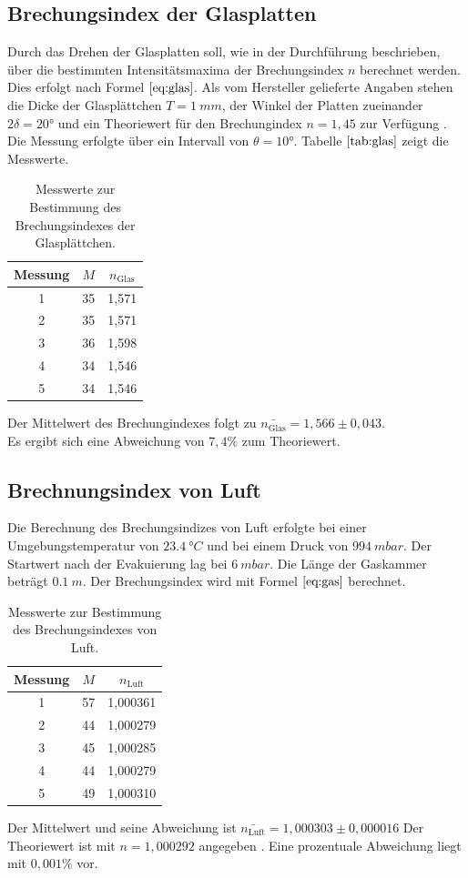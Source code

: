 \subsection{Brechungsindex der Glasplatten}
Durch das Drehen der Glasplatten soll, wie in der Durchführung beschrieben, über die bestimmten Intensitätsmaxima
der Brechungsindex $n$ berechnet werden.
Dies erfolgt nach Formel $\ref{eq:glas}$.
Als vom Hersteller gelieferte Angaben \cite{Anleitung} stehen die Dicke der Glasplättchen $T=\SI{1}{mm}$, der Winkel der Platten zueinander $2\delta=20°$ und ein Theoriewert für
den Brechungindex $n= 1,45$ zur Verfügung \cite{brechglas}.
Die Messung erfolgte über ein Intervall von $\theta = 10°$.
Tabelle $\ref{tab:glas}$ zeigt die Messwerte.

\begin{table}[H]
\centering
\begin{tabular}{c c c}
{Messung} & {$M$} & {$n_\text{Glas}$} \\
\midrule
1 & 35 & 1,571 \\
2 & 35 & 1,571 \\
3 & 36 & 1,598 \\
4 & 34 & 1,546 \\
5 & 34 & 1,546 \\
\end{tabular}
\caption{Messwerte zur Bestimmung des Brechungsindexes der Glasplättchen.}
\label{tab:glas}
\end{table}
Der Mittelwert des Brechungindexes folgt zu $\bar{n_\text{Glas}}=1,566 \pm 0,043$.\\
Es ergibt sich eine Abweichung von $7,4 \%$ zum Theoriewert.

\subsection{Brechnungsindex von Luft}
Die Berechnung des Brechungsindizes von Luft erfolgte bei einer Umgebungstemperatur von $\SI{23,4}{°C}$ und bei einem Druck von $\SI{994}{mbar}$.
Der Startwert nach der Evakuierung lag bei $\SI{6}{mbar}$.
Die Länge der Gaskammer beträgt $\SI{0,1}{m}$.
Der Brechungsindex wird mit Formel $\ref{eq:gas}$ berechnet.
\begin{table}[H]
\centering
\begin{tabular}{c c c}
{Messung} & {$M$} & {$n_\text{Luft}$} \\
\midrule
1 & 57 & 1,000361 \\
2 & 44 & 1,000279 \\
3 & 45 & 1,000285 \\
4 & 44 & 1,000279 \\
5 & 49 & 1,000310 \\
\end{tabular}
\caption{Messwerte zur Bestimmung des Brechungsindexes von Luft.}
\label{tab:luft}
\end{table}
Der Mittelwert und seine Abweichung ist $\bar{n_\text{Luft}}= 1,000303 \pm 0,000016$
Der Theoriewert ist mit $n=1,000292$ angegeben \cite{brechglas}.
Eine prozentuale Abweichung liegt mit $0,001\%$ vor.
